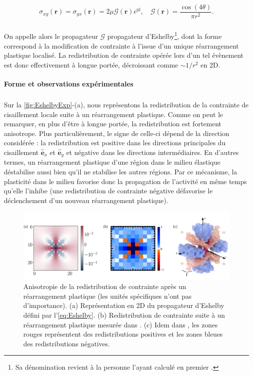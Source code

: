 \begin{equation}
	\sigma_{xy}(\mathbf{r})= \sigma_{yx}(\mathbf{r}) = 2\mu \mathcal{G}(\mathbf{r}) \epsilon^\text{pl}, \quad \mathcal{G}(\mathbf{r}) = \frac{\cos (4\theta)}{\pi r^2}.
	\label{eq:Eshelby}
\end{equation}

\subparagraph{}On appelle alors le propagateur $\mathcal{G}$ propagateur d'Eshelby\footnote{Sa dénomination revient à la personne l'ayant calculé en premier \cite{eshelby_determination_1997}.}, dont la forme correspond à la modification de contrainte à l'issue d'un unique réarrangement plastique localisé. La redistribution de contrainte opérée lors d'un tel évènement est donc effectivement à longue portée, décroissant comme $\sim 1/r^2$ en 2D.

\paragraph{Forme et observations expérimentales}

\subparagraph{}Sur la \autoref{fig:EshelbyExp}-(a), nous représentons la redistribution de la contrainte de cisaillement locale suite à un réarrangement plastique. Comme on peut le remarquer, en plus d'être à longue portée, la redistribution est fortement anisotrope. Plus particulièrement, le signe de celle-ci dépend de la direction considérée : la redistribution est positive dans les directions principales du cisaillement $\hat{\mathbf{e}}_x$ et $\hat{\mathbf{e}}_y$ et négative dans les directions intermédiaires. En d'autres termes, un réarrangement plastique d'une région dans le milieu élastique déstabilise aussi bien qu'il ne stabilise les autres régions. Par ce mécanisme, la plasticité dans le milieu favorise donc la propagation de l'activité en même temps qu'elle l'inhibe (une redistribution de contrainte négative défavorise le déclenchement d'un nouveau réarrangement plastique).

\begin{figure}[h]
	\centering
	\includegraphics[width=\textwidth]{Chapitre1/Figures/InterpretationCDP/EshelbyExp.pdf}
	\caption{Anisotropie de la redistribution de contrainte après un réarrangement plastique (les unités spécifiques n'ont pas d'importance). (a) Représentation en 2D du propagateur d'Eshelby défini par l'\autoref{eq:Eshelby}. (b) Redistribution de contrainte suite à un réarrangement plastique mesurée dans \cite{desmond_measurement_2015}. (c) Idem dans \cite{schott_multiscale_2024}, les zones rouges représentent des redistributions positives et les zones bleues des redistributions négatives.}
	\label{fig:EshelbyExp}
\end{figure}


